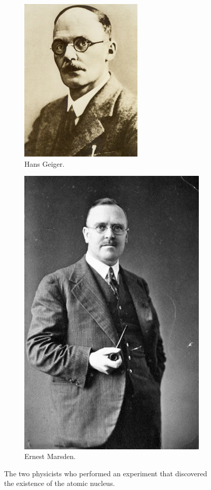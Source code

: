 \documentclass[a4paper]{amsbook}
\theoremstyle{definition}
\numberwithin{exercise}{chapter}
\numberwithin{exercise}{chapter}
\begin{document}
\begin{figure}
  \centering
  \begin{subfigure}{0.4\textwidth}
    \includegraphics[height = 0.3\textheight]{geiger}
    \caption{Hans Geiger. \label{fig:geiger}}
  \end{subfigure}\hfill%
  \begin{subfigure}{0.4\textwidth}
    \includegraphics[height = 0.3\textheight]{marsden}
    \caption{Ernest Marsden. \label{fig:marsden}}
  \end{subfigure}%
  \caption{The two physicists who performed an experiment that discovered the existence of the atomic nucleus. \label{fig:geigerandmarsden}}
\end{figure}
\end{document}
